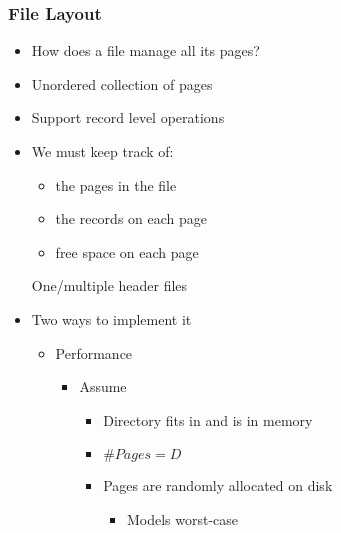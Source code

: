 \subsubsection{File Layout}
\begin{itemize}
    \item How does a file manage all its pages?
    \item Unordered collection of pages
    \item Support record level operations
    \item We must keep track of:
        \begin{itemize}
            \item the pages in the file
            \item the records on each page
            \item free space on each page
        \end{itemize}
     One/multiple header files
    \item Two ways to implement it
        \begin{itemize}
             One single page
                \begin{itemize}
                    \item Kind of the root
                    \item Has to pointer to two linked lists
                        \begin{itemize}
                            \item Free pages list
                            \item Data pages list
                        \end{itemize}
                \end{itemize}
            \icon No global view on data
            \item Performance
                \begin{itemize}
                    \item Assume
                        \begin{itemize}
                            \item Directory fits in and is in memory
                            \item $\# Pages = D$
                            \item Pages are randomly allocated on disk
                                \begin{itemize}
                                    \item Models worst-case

\end{itemize}
\end{itemize}
\end{itemize}
\end{itemize}
\end{itemize}
